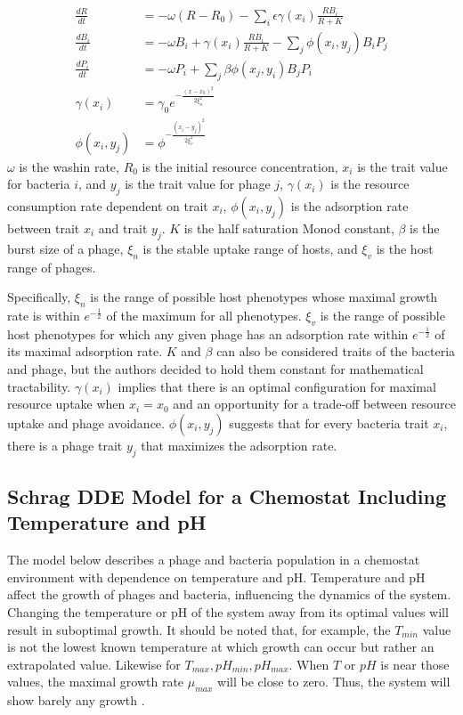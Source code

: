 \begin{align*}
    \frac{dR}{dt} &= -\omega(R-R_0) - \sum_i \epsilon\gamma(x_i)\frac{RB_i}{R+K} \\
    \frac{dB_i}{dt} &= -\omega B_i+ \gamma(x_i)\frac{RB_i}{R+K} - \sum_j \phi(x_i, y_j)B_i P_j \\ 
    \frac{dP_i}{dt} &= -\omega P_i + \sum_j \beta \phi(x_j, y_i)B_j P_i\\
    \gamma(x_i) &= \gamma_0 e^{-\frac{(x-x_0)^2}{2\xi_n^2}}\\
    \phi(x_i, y_j) &= \phi^{-\frac{(x_i-y_j)^2}{2\xi_v^2}}
\end{align*}
$\omega$ is the washin rate, $R_0$ is the initial resource concentration, $x_i$ is the trait value for bacteria $i$, and $y_j$ is the trait value for phage $j$, $\gamma(x_i)$ is the resource consumption rate dependent on trait $x_i$, $\phi(x_i, y_j)$ is the adsorption rate between trait $x_i$ and trait $y_j$. 
$K$ is the half saturation Monod constant, $\beta$ is the burst size of a phage, $\xi_n$ is the stable uptake range of hosts, and $\xi_v$ is the host range of phages. 

Specifically, $\xi_n$ is the range of possible host phenotypes whose maximal growth rate is within $e^{-\frac{1}{2}}$ of the maximum for all phenotypes. 
$\xi_v$ is the range of possible host phenotypes for which any given phage has an adsorption rate within $e^{-\frac{1}{2}}$ of its maximal adsorption rate. 
$K$ and $\beta$ can also be considered traits of the bacteria and phage, but the authors decided to hold them constant for mathematical tractability. 
$\gamma(x_i)$ implies that there is an optimal configuration for maximal resource uptake when $ x_i = x_0$ and an opportunity for a trade-off between resource uptake and phage avoidance. 
$\phi(x_i, y_j)$ suggests that for every bacteria trait $x_i$, there is a phage trait $y_j$ that maximizes the adsorption rate. 

\subsection{Schrag DDE Model for a Chemostat Including Temperature and pH}
\label{sec:lit:schrag}
The \citet{bekeModellingInteractionBacteriophages2016, schragHostParasiteCoexistenceRole1996} model below describes a phage and bacteria population in a chemostat environment with dependence on temperature and pH. 
Temperature and pH affect the growth of phages and bacteria, influencing the dynamics of the system. 
Changing the temperature or pH of the system away from its optimal values will result in suboptimal growth.
It should be noted that, for example, the $T_{min}$ value is not the lowest known temperature at which growth can occur but rather an extrapolated value. 
Likewise for $T_{max}, pH_{min}, pH_{max}$. 
When $T$ or $pH$ is near those values, the maximal growth rate $\mu_{max}$ will be close to zero. Thus, the system will show barely any growth \cite{bekeModellingInteractionBacteriophages2016}. 

